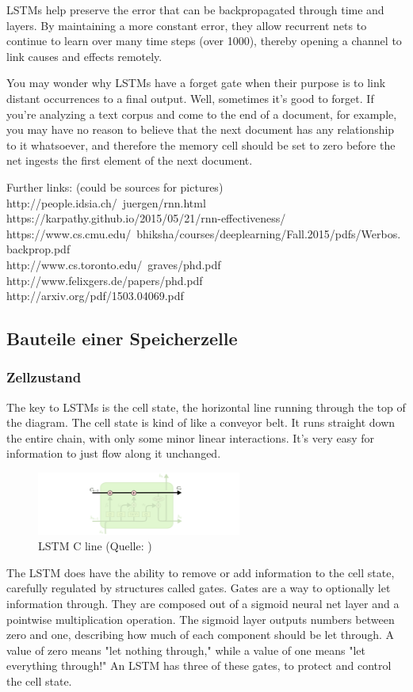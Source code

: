 {LSTMs help preserve the error that can be backpropagated through time and layers. By maintaining a more constant error, they allow recurrent nets to continue to learn over many time steps (over 1000), thereby opening a channel to link causes and effects remotely.

You may wonder why LSTMs have a forget gate when their purpose is to link distant occurrences to a final output. Well, sometimes it’s good to forget. If you’re analyzing a text corpus and come to the end of a document, for example, you may have no reason to believe that the next document has any relationship to it whatsoever, and therefore the memory cell should be set to zero before the net ingests the first element of the next document.


Further links: (could be sources for pictures)\\
http://people.idsia.ch/~juergen/rnn.html\\
https://karpathy.github.io/2015/05/21/rnn-effectiveness/\\
https://www.cs.cmu.edu/~bhiksha/courses/deeplearning/Fall.2015/pdfs/Werbos.backprop.pdf\\
http://www.cs.toronto.edu/~graves/phd.pdf\\
http://www.felixgers.de/papers/phd.pdf\\
http://arxiv.org/pdf/1503.04069.pdf\\


\subsection{Bauteile einer Speicherzelle}
\subsubsection{Zellzustand}
The key to LSTMs is the cell state, the horizontal line running through the top of the diagram.
The cell state is kind of like a conveyor belt. It runs straight down the entire chain, with only some minor linear interactions. It’s very easy for information to just flow along it unchanged.
\renewcommand{\figurename}{Abb.}
\begin{figure}[htp]
\centering
\includegraphics[width=0.60\textwidth]{pictures/LSTM3-C-line.png}
\caption[LSTM C line]{LSTM C line (Quelle: \cite{OlahImg})}
\end{figure}
The LSTM does have the ability to remove or add information to the cell state, carefully regulated by structures called gates.
Gates are a way to optionally let information through. They are composed out of a sigmoid neural net layer and a pointwise multiplication operation.
The sigmoid layer outputs numbers between zero and one, describing how much of each component should be let through. A value of zero means "let nothing through," while a value of one means "let everything through!"
An LSTM has three of these gates, to protect and control the cell state.

}
